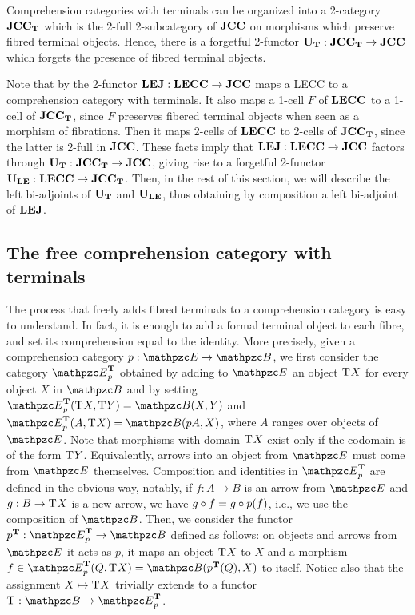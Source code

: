 \documentclass{lmcs} %
\theoremstyle{plain}\newtheorem{satz}[thm]{Satz} %
\begin{document}
Comprehension categories with terminals can be organized into a 2-category $\mathbf{JCC_T}$ which is the 2-full 2-subcategory of $\mathbf{JCC}$ on morphisms which preserve fibred terminal objects. Hence, there is a forgetful 2-functor $\mathbf{U_T}:\mathbf{JCC_T}\to\mathbf{JCC}$ which forgets the presence of fibred terminal objects.

Note that by  the 2-functor $\mathbf{LEJ}:\mathbf{LECC}\to\mathbf{JCC}$ maps a LECC to a comprehension category with terminals. It also maps a 1-cell $F$ of $\mathbf{LECC}$ to a 1-cell of $\mathbf{JCC_T}$, since $F$ preserves fibered terminal objects when seen as a morphism of fibrations. Then it maps 2-cells of $\mathbf{LECC}$ to 2-cells of $\mathbf{JCC_T}$, since the latter is 2-full in $\mathbf{JCC}$. 
These facts imply that $\mathbf{LEJ}:\mathbf{LECC}\to\mathbf{JCC}$ factors through $\mathbf{U_T}:\mathbf{JCC_T}\to\mathbf{JCC}$, giving rise to a forgetful 2-functor $\mathbf{U_{LE}}:\mathbf{LECC}\to\mathbf{JCC_T}$.
% 
Then,  in the rest of this section, we will describe the left bi-adjoints of 
$\mathbf{U_T}$ and $\mathbf{U_{LE}}$, 
thus obtaining by composition a left bi-adjoint of $\mathbf{LEJ}$. 


\subsection{The free comprehension category with terminals}

The process that freely adds fibred terminals to a comprehension category is easy to understand.
In fact, it is enough to add a formal terminal object to each fibre, and set its comprehension equal to the identity.
% 
More precisely, given a comprehension category $p:\ct{E}\to\ct{B}$, 
we first consider the category $\JTDomE{p}$  obtained by adding to $\ct{E}$ an object $\mathrm{T}^{}X$  for every object $X$ in $\ct{B}$ and 
by setting $\Hom{\JTDomE{p}}(\term{}X,\term{}Y) = \Hom{\ct{B}}(X,Y)$  and $\Hom{\JTDomE{p}}(A, \term{}X) = \Hom{\ct{B}}(pA, X)$, where $A$ ranges over objects of $\ct{E}$.
Note that morphisms with domain $\mathrm{T}^{}X$ exist only if the codomain is of the form $\mathrm{T}^{}Y$.
Equivalently, arrows into an object from $\ct{E}$ must come from $\ct{E}$ themselves.
Composition and identities in $\JTDomE{p}$ are defined in the obvious way, notably, 
if $f : A\to B$ is an arrow from $\ct{E}$ and $g : B \to \mathrm{T}^{}X$ is a new arrow, we have 
$g\circ f = g\circ p(f)$, i.e., we use the composition of $\ct{B}$. 
% 
Then, we consider the functor $\JTFib{p} : \JTDomE{p}\to\ct{B}$ defined as follows: 
on objects and arrows from $\ct{E}$ it acts as $p$, 
it maps an object $\mathrm{T}^{}X$ to $X$ and  a morphism $f \in \Hom{\JTDomE{p}}(Q,\term{} X) = \Hom{\ct{B}}(\JTFib{p}(Q),X)$ to itself. 
Notice also that the assignment $X\mapsto\mathrm{T}^{} X$ trivially extends to a functor 
$\term{} : \ct{B} \to \JTDomE{p}$. 
\end{document}
